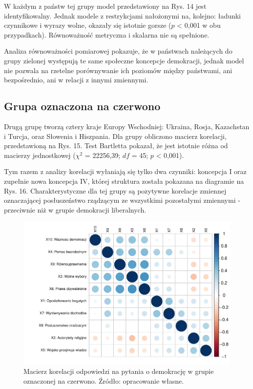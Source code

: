\documentclass[12pt]{article}
\begin{document}
W każdym z państw tej grupy model przedstawiony na Rys. 14 jest identyfikowalny. Jednak modele z restrykcjami nałożonymi na, kolejno: ładunki czynnikowe i wyrazy wolne, okazały się istotnie gorsze (\(p\) \textless{} 0,001 w obu przypadkach). Równoważność metryczna i skalarna nie są spełnione.

Analiza równoważności pomiarowej pokazuje, że w państwach należących do grupy zielonej występują te same społeczne koncepcje demokracji, jednak model nie pozwala na rzetelne porównywanie ich poziomów między państwami, ani bezpośrednio, ani w relacji z innymi zmiennymi.

\hypertarget{grupa-oznaczona-na-czerwono}{%
\subsection{Grupa oznaczona na czerwono}\label{grupa-oznaczona-na-czerwono}}

Drugą grupę tworzą cztery kraje Europy Wschodniej: Ukraina, Rosja, Kazachstan i Turcja, oraz Słowenia i Hiszpania. Dla grupy obliczono macierz korelacji, przedstawioną na Rys. 15. Test Bartletta pokazał, że jest istotnie różna od macierzy jednostkowej (\(\chi^2\) = 22256,39; \(df\) = 45; \(p\) \textless{} 0,001).

Tym razem z analizy korelacji wyłaniają się tylko dwa czynniki: koncepcja I oraz zupełnie nowa koncepcja IV, której struktura została pokazana na diagramie na Rys. 16. Charakterystyczne dla tej grupy są pozytywne korelacje zmiennej oznaczającej posłuszeństwo rządzącym ze wszystkimi pozostałymi zmiennymi - przeciwnie niż w grupie demokracji liberalnych.

\begin{figure}

\includegraphics{text_ASA_files/figure-latex/cor-matrix-3-1} \hfill{}

\caption{Macierz korelacji odpowiedzi na pytania o demokrację w grupie oznaczonej na czerwono. Źródło: opracowanie własne.}\label{fig:cor-matrix-3}
\end{figure}
\end{document}
